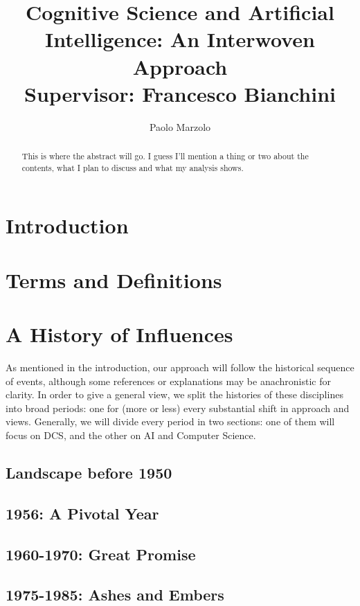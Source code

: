 \documentclass{article}
\title{Cognitive Science and Artificial Intelligence: An Interwoven Approach \\
\large Supervisor: Francesco Bianchini}
\author{Paolo Marzolo}
\begin{document}
\begin{abstract}
    This is where the abstract will go. I guess I'll mention a thing or two about the contents, what I plan to discuss and what my analysis shows.
\end{abstract}

\maketitle
\newpage

\section{Introduction}


\section{Terms and Definitions}


\section{A History of Influences}
As mentioned in the introduction, our approach will follow the historical sequence of events, although some references or explanations may be anachronistic for clarity. In order to give a general view, we split the histories of these disciplines into broad periods: one for (more or less) every substantial shift in approach and views. Generally, we will divide every period in two sections: one of them will focus on DCS, and the other on AI and Computer Science.
\cite{besoldNeuralSymbolicLearningReasoning2017}

\subsection{Landscape before 1950}


\subsection{1956: A Pivotal Year}


\subsection{1960-1970: Great Promise}


\subsection{1975-1985: Ashes and Embers}

\end{document}
